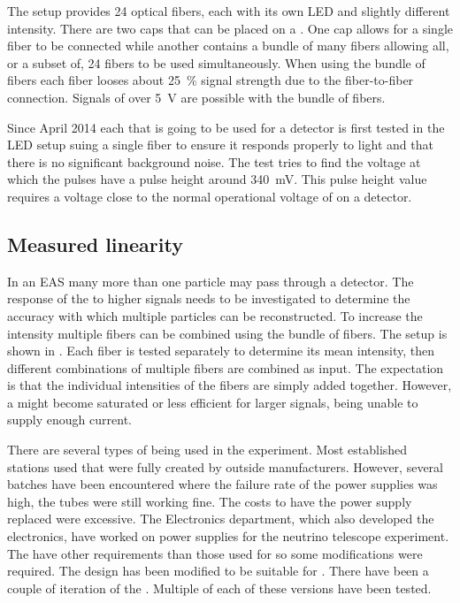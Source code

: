 The setup provides 24 optical fibers, each with its own LED and slightly
different intensity. There are two caps that can be placed on a \pmt.
One cap allows for a single fiber to be connected while another contains
a bundle of many fibers allowing all, or a subset of, 24 fibers to be
used simultaneously. When using the bundle of fibers each fiber looses about
\SI{25}{\percent} signal strength due to the fiber-to-fiber connection.
Signals of over \SI{5}{\volt} are possible with the bundle of fibers.

Since April 2014 each \pmt that is going to be used for a \hisparc
detector is first tested in the LED setup suing a single fiber to ensure
it responds properly to light and that there is no significant
background noise. The test tries to find the voltage at which the pulses
have a pulse height around \SI{340}{\milli\volt}. This pulse height
value requires a voltage close to the normal operational voltage of
\pmts on a \hisparc detector.


\subsection{Measured linearity}

In an EAS many more than one particle may pass through a detector. The
response of the \pmt to higher signals needs to be investigated to
determine the accuracy with which multiple particles can be
reconstructed. To increase the intensity multiple fibers can be combined
using the bundle of fibers. The setup is shown in . Each fiber is tested separately to determine
its mean intensity, then different combinations of multiple fibers are
combined as input. The expectation is that the individual intensities of
the fibers are simply added together. However, a \pmt might become
saturated or less efficient for larger signals, being unable to supply
enough current.

There are several types of \pmt being used in the \hisparc experiment.
Most established stations used \pmts that were fully created by outside
manufacturers. However, several batches have been encountered where the
failure rate of the \pmt power supplies was high, the tubes were still
working fine. The costs to have the power supply replaced were
excessive. The \nikhef Electronics department, which also developed the
\hisparc electronics, have worked on \pmt power supplies for the \kmnet
neutrino telescope experiment. The \kmnet \pmts have other requirements
than those used for \hisparc so some modifications were required. The
\kmnet design has been modified to be suitable for \hisparc. There have
been a couple of iteration of the \hisparc \pmts. Multiple \pmts of each
of these versions have been tested.

